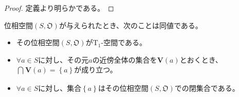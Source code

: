 \documentclass[dvipdfmx]{jsarticle}
\begin{document}
\begin{proof} 定義より明らかである。
\end{proof}
\begin{thm}\label{8.1.7.3}
位相空間$\left( S,\mathfrak{O} \right)$が与えられたとき、次のことは同値である。
\begin{itemize}
\item
  その位相空間$\left( S,\mathfrak{O} \right)$が$\mathrm{T}_{1}$-空間である。
\item
  $\forall a \in S$に対し、その元$a$の近傍全体の集合を$\mathbf{V}(a)$とおくとき、$\bigcap_{} {\mathbf{V}(a)} = \left\{ a \right\}$が成り立つ。
\item
  $\forall a \in S$に対し、集合$\left\{ a \right\}$はその位相空間$\left( S,\mathfrak{O} \right)$での閉集合である。
\end{itemize}
\end{thm}
\end{document}
